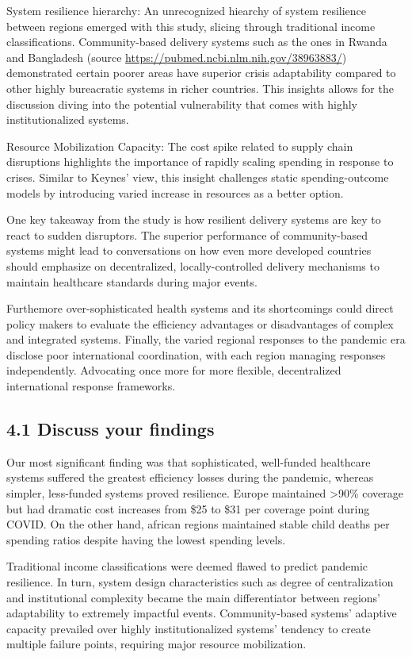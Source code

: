 \documentclass[
]{article}
\begin{document}
System resilience hierarchy: An unrecognized hiearchy of system
resilience between regions emerged with this study, slicing through
traditional income classifications. Community-based delivery systems
such as the ones in Rwanda and Bangladesh (source
\url{https://pubmed.ncbi.nlm.nih.gov/38963883/}) demonstrated certain
poorer areas have superior crisis adaptability compared to other highly
bureacratic systems in richer countries. This insights allows for the
discussion diving into the potential vulnerability that comes with
highly institutionalized systems.

Resource Mobilization Capacity: The cost spike related to supply chain
disruptions highlights the importance of rapidly scaling spending in
response to crises. Similar to Keynes' view, this insight challenges
static spending-outcome models by introducing varied increase in
resources as a better option.

One key takeaway from the study is how resilient delivery systems are
key to react to sudden disruptors. The superior performance of
community-based systems might lead to conversations on how even more
developed countries should emphasize on decentralized,
locally-controlled delivery mechanisms to maintain healthcare standards
during major events.

Furthemore over-sophisticated health systems and its shortcomings could
direct policy makers to evaluate the efficiency advantages or
disadvantages of complex and integrated systems. Finally, the varied
regional responses to the pandemic era disclose poor international
coordination, with each region managing responses independently.
Advocating once more for more flexible, decentralized international
response frameworks.

\subsection{4.1 Discuss your findings}\label{discuss-your-findings}

Our most significant finding was that sophisticated, well-funded
healthcare systems suffered the greatest efficiency losses during the
pandemic, whereas simpler, less-funded systems proved resilience. Europe
maintained \textgreater90\% coverage but had dramatic cost increases
from \$25 to \$31 per coverage point during COVID. On the other hand,
african regions maintained stable child deaths per spending ratios
despite having the lowest spending levels.

Traditional income classifications were deemed flawed to predict
pandemic resilience. In turn, system design characteristics such as
degree of centralization and institutional complexity became the main
differentiator between regions' adaptability to extremely impactful
events. Community-based systems' adaptive capacity prevailed over highly
institutionalized systems' tendency to create multiple failure points,
requiring major resource mobilization.
\end{document}
